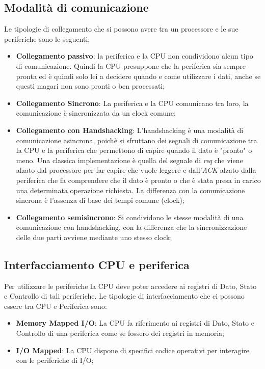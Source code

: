 \subsection{Modalità di comunicazione}
Le tipologie di collegamento che si possono avere tra un processore e le sue periferiche sono le seguenti:
\begin{itemize}
    \item \textbf{Collegamento passivo}: la periferica e la CPU non condividono alcun tipo di comunicazione. Quindi la CPU presuppone che la periferica sia sempre pronta ed è quindi solo lei a decidere quando e come utilizzare i dati, anche se questi magari non sono pronti o ben processati;
    \item \textbf{Collegamento Sincrono}: La periferica e la CPU comunicano tra loro, la comunicazione è sincronizzata da un clock comune;
    \item \textbf{Collegamento con Handshacking}: L'handshacking è una modalità di comunicazione asincrona, poichè si sfruttano dei segnali di comunicazione tra la CPU e la periferica che permettono di capire quando il dato è "pronto" o meno. Una classica implementazione è quella del segnale di \textit{req} che viene alzato dal processore per far capire che vuole leggere e dall'\textit{ACK} alzato dalla periferica che fa comprendere che il dato è pronto o che è stata presa in carico una determinata operazione richiesta. La differenza con la comunicazione sincrona è l'assenza di base dei tempi comune (clock);
    \item \textbf{Collegamento semisincrono}: Si condividono le stesse modalità di una comunicazione con handshacking, con la differenza che la sincronizzazione delle due parti avviene mediante uno stesso clock;
\end{itemize}

\subsection{Interfacciamento CPU e periferica}
Per utilizzare le periferiche la CPU deve poter accedere ai registri di Dato, Stato e Controllo di tali periferiche. Le tipologie di interfacciamento che ci possono essere tra CPU e Periferica sono:
\begin{itemize}
    \item \textbf{Memory Mapped I/O}: La CPU fa riferimento ai registri di Dato, Stato e Controllo di una periferica come se fossero dei registri in memoria;
    \item \textbf{I/O Mapped}: La CPU dispone di specifici codice operativi per interagire con le periferiche di I/O;
\end{itemize}

